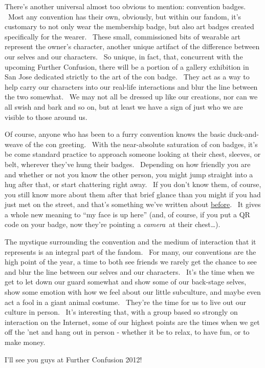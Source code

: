 There's another universal almost too obvious to mention: convention
badges. ~Most any convention has their own, obviously, but within our
fandom, it's customary to not only wear the membership badge, but also
art badges created specifically for the wearer. ~These small,
commissioned bits of wearable art represent the owner's character,
another unique artifact of the difference between our selves and our
characters. ~So unique, in fact, that, concurrent with the upcoming
Further Confusion, there will be a portion of a gallery exhibition in
San Jose dedicated strictly to the art of the con badge. ~They act as a
way to help carry our characters into our real-life interactions and
blur the line between the two somewhat. ~We may not all be dressed up
like our creations, nor can we all swish and bark and so on, but at
least we have a sign of just who we are visible to those around us.

Of course, anyone who has been to a furry convention knows the basic
duck-and-weave of the con greeting. ~With the near-absolute saturation
of con badges, it's be come standard practice to approach someone
looking at their chest, sleeves, or belt, wherever they've hung their
badges. ~Depending on how friendly you are and whether or not you know
the other person, you might jump straight into a hug after that, or
start chattering right away. ~If you don't know them, of course, you
still know more about them after that brief glance than you might if you
had just met on the street, and that's something we've written about
\href{http://adjectivespecies.com/2011/11/30/first-impressions/}{before}.
~It gives a whole new meaning to ``my face is up here'' (and, of course,
if you put a QR code on your badge, now they're pointing a
\emph{camera}~at their chest\ldots{}).

The mystique surrounding the convention and the medium of interaction
that it represents is an integral part of the fandom. ~For many, our
conventions are the high point of the year, a time to both see friends
we rarely get the chance to see and blur the line between our selves and
our characters. ~It's the time when we get to let down our guard
somewhat and show some of our back-stage selves, show some emotion with
how we feel about our little subculture, and maybe even act a fool in a
giant animal costume. ~They're the time for us to live out our culture
in person. ~It's interesting that, with a group based so strongly on
interaction on the Internet, some of our highest points are the times
when we get off the 'net and hang out in person - whether it be to
relax, to have fun, or to make money.

I'll see you guys at Further Confusion 2012!
